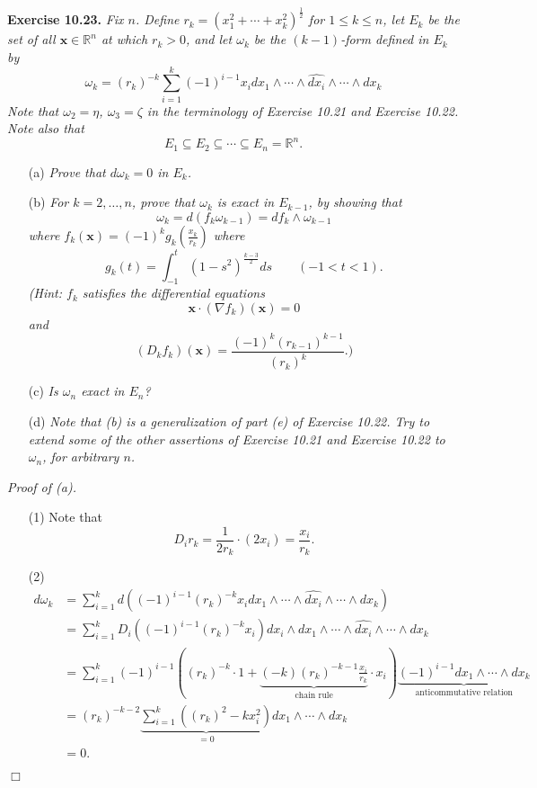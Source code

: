 \documentclass{article}
\begin{document}
\textbf{Exercise 10.23.}
\emph{Fix $n$.
Define $r_k = (x_1^2+\cdots+x_k^2)^{\frac{1}{2}}$ for $1 \leq k \leq n$,
let $E_k$ be the set of all $\mathbf{x} \in \mathbb{R}^n$ at which $r_k > 0$,
and let $\omega_k$ be the $(k-1)$-form defined in $E_k$ by
\[
  \omega_k
  = (r_k)^{-k}
    \sum_{i=1}^{k} (-1)^{i-1} x_i dx_1 \wedge \cdots
    \wedge \widehat{dx_i} \wedge \cdots \wedge dx_k
\]
Note that $\omega_2 = \eta$, $\omega_3 = \zeta$ in the terminology of
Exercise 10.21 and Exercise 10.22.
Note also that}
\[
  E_1 \subseteq E_2 \subseteq \cdots \subseteq E_n = \mathbb{R}^n.
\]
\begin{enumerate}
\item[(a)]
  \emph{Prove that $d\omega_k = 0$ in $E_k$.}

\item[(b)]
  \emph{For $k=2,\ldots,n$, prove that $\omega_k$ is exact in $E_{k-1}$,
  by showing that
  \[
    \omega_k = d(f_k\omega_{k-1}) = df_k \wedge \omega_{k-1}
  \]
  where $f_k(\mathbf{x}) = (-1)^k g_k\left( \frac{x_k}{r_k} \right)$
  where
  \[
    g_k(t) = \int_{-1}^{t} (1-s^2)^{\frac{k-3}{2}} ds
    \qquad
    (-1 < t < 1).
  \]
  (Hint: $f_k$ satisfies the differential equations
  \[
    \mathbf{x} \cdot (\nabla f_k)(\mathbf{x}) = 0
  \]
  and
  \[
    (D_k f_k)(\mathbf{x}) = \frac{(-1)^k(r_{k-1})^{k-1}}{(r_k)^k}.)
  \]}

\item[(c)]
  \emph{Is $\omega_n$ exact in $E_n$?}

\item[(d)]
  \emph{Note that (b) is a generalization of part (e) of Exercise 10.22.
  Try to extend some of the other assertions of Exercise 10.21 and Exercise 10.22
  to $\omega_n$, for arbitrary $n$.} \\
\end{enumerate}



\emph{Proof of (a).}
\begin{enumerate}
\item[(1)]
  Note that
  \[
    D_i r_k = \frac{1}{2r_k} \cdot (2x_i) = \frac{x_i}{r_k}.
  \]
\item[(2)]
  \begin{align*}
    d\omega_k
    &= \sum_{i=1}^{k} d\left(
      (-1)^{i-1} (r_k)^{-k} x_i
      dx_1 \wedge \cdots \wedge \widehat{dx_i} \wedge \cdots \wedge dx_k\right) \\
    &= \sum_{i=1}^{k} D_i \left( (-1)^{i-1} (r_k)^{-k} x_i \right)
      dx_i \wedge dx_1 \wedge \cdots \wedge \widehat{dx_i} \wedge \cdots \wedge dx_k \\
    &= \sum_{i=1}^{k} (-1)^{i-1} \left(
      (r_k)^{-k} \cdot 1 + \underbrace{(-k)(r_k)^{-k-1} \frac{x_i}{r_k}}_{\text{chain rule}}
        \cdot x_i \right)
      \underbrace{(-1)^{i-1} dx_1 \wedge \cdots \wedge dx_k}_{\text{anticommutative relation}} \\
    &= (r_k)^{-k-2} \underbrace{\sum_{i=1}^{k} \left(
      (r_k)^2 - k x_i^2 \right)}_{= 0}
      dx_1 \wedge \cdots \wedge dx_k \\
    &= 0.
  \end{align*}
\end{enumerate}
$\Box$ \\
\end{document}
